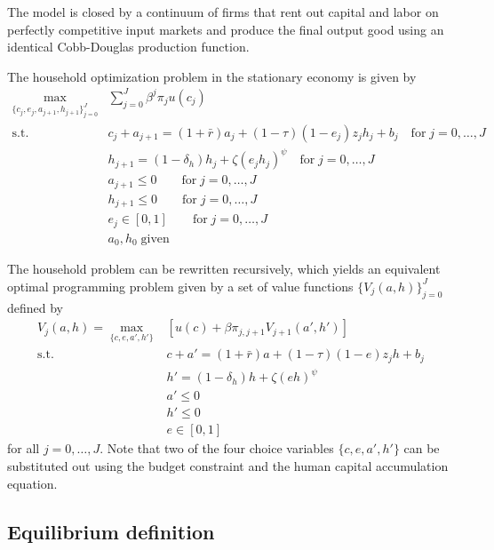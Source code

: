 The model is closed by a continuum of firms that rent out capital and labor on perfectly competitive input markets and produce the final output good using an identical Cobb-Douglas production function.

The household optimization problem in the stationary economy is given by
\begin{align*}
    \max_{\{c_j, e_j, a_{j+1}, h_{j+1}\}_{j=0}^J} & \sum_{j=0}^J \beta^j \pi_{j} u(c_j) \\
    \text{s.t.} \;  & c_j + a_{j+1} = (1+\bar{r}) a_j + (1-\tau) (1-e_j) z_j h_j + b_j \quad\text{for}\; j=0,\dots,J \\
                    & h_{j+1} = (1-\delta_h) h_j + \zeta (e_j h_j)^\psi \quad\text{for}\; j=0,\dots,J \\
                    & a_{j+1} \leq 0 \quad \quad\text{for}\; j=0,\dots,J \\
                    & h_{j+1} \leq 0 \quad \quad\text{for}\; j=0,\dots,J \\
                    & e_j \in [0, 1] \quad \quad\text{for}\; j=0,\dots,J \\
                    & a_0, h_0 \;\text{given}
\end{align*}

The household problem can be rewritten recursively, which yields an equivalent optimal programming problem given by a set of value functions $\{V_j(a, h)\}_{j=0}^J$ defined by
\begin{align*}
    V_j (a, h) = \max_{ \{c, e, a', h' \} } & [ u(c) + \beta \pi_{j, j+1} V_{j+1} (a', h') ]  \\
    \text{s.t.} \;  & c + a' = (1+\bar{r}) a + (1-\tau) (1-e) z_j h + b_j \\
                    & h' = (1-\delta_h) h + \zeta (e h)^\psi \\
                    & a' \leq 0 \\
                    & h' \leq 0 \\
                    & e \in [0, 1]
\end{align*}
for all $j=0, \dots, J$. Note that two of the four choice variables $\{c, e, a', h' \}$ can be substituted out using the budget constraint and the human capital accumulation equation.

\subsection{Equilibrium definition}

